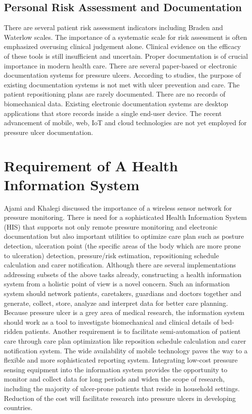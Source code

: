 \subsection{Personal Risk Assessment and Documentation}

There are several patient risk assessment indicators including Braden and Waterlow scales. \cite{bradenscale} The importance of a systematic scale for risk assessment is often emphasized overusing clinical judgement alone. Clinical evidence on the efficacy of these tools is still insufficient and uncertain.\cite{cochranerisk}
Proper documentation is of crucial importance in modern health care. There are several paper-based or electronic documentation systems for pressure ulcers. According to studies, the purpose of existing documentation systems is not met with ulcer prevention and care.\cite{sostoolkit} The patient repositioning plans are rarely documented. There are no records of biomechanical data. Existing electronic documentation systems are desktop applications that store records inside a single end-user device. The recent advancement of mobile, web, IoT and cloud technologies are not yet employed for pressure ulcer documentation. 

\section{Requirement of A Health Information System}
Ajami and Khalegi discussed the importance of a wireless sensor network for pressure monitoring.\cite{his} There is need for a sophisticated Health Information System (HIS) that supports not only remote pressure monitoring and electronic documentation but also important utilities to optimize care plan such as posture detection, ulceration point (the specific areas of the body which are more prone to ulceration) detection, pressure/risk estimation, repositioning schedule calculation and carer notification. Although there are several implementations addressing subsets of the above tasks already, constructing a health information system from a holistic point of view is a novel concern. Such an information system should network patients, caretakers, guardians and doctors together and generate, collect, store, analyze and interpret data for better care planning. Because pressure ulcer is a grey area of medical research, the information system should work as a tool to investigate biomechanical and clinical details of bed-ridden patients. Another requirement is to facilitate semi-automation of patient care through care plan optimization like reposition schedule calculation and carer notification system. The wide availability of mobile technology paves the way to a flexible and more sophisticated reporting system. Integrating low-cost pressure sensing equipment into the information system provides the opportunity to monitor and collect data for long periods and widen the scope of research, including the majority of ulcer-prone patients that reside in household settings. Reduction of the cost will facilitate research into pressure ulcers in developing countries.

